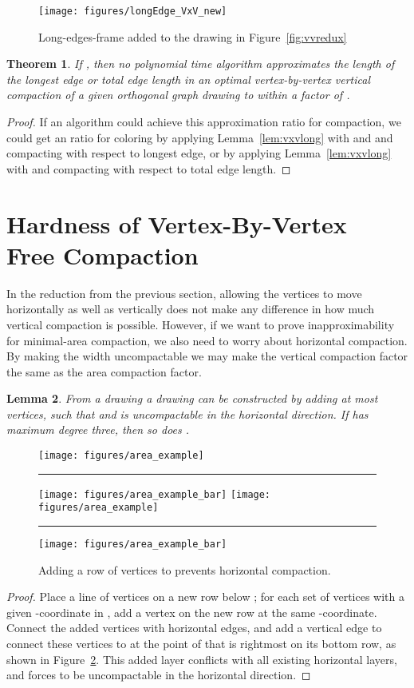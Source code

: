 \documentclass[12pt]{article}
\newtheorem{theorem}{Theorem}
\newtheorem{lemma}[theorem]{Lemma}
\theoremstyle{definitions}
\begin{document}
\begin{figure}[t]
\centering
\texttt{[image: figures/longEdge\_VxV\_new]}
\caption{
\label{fig:longEdge_VxV}
Long-edges-frame added to the drawing in Figure~\ref{fig:vvredux}}
\end{figure}

\begin{theorem}
If , then no polynomial time algorithm approximates the length of the longest edge or total edge length in an optimal vertex-by-vertex vertical compaction of a given orthogonal graph drawing to within a factor of .
\end{theorem}
\begin{proof}
If an algorithm could achieve this approximation ratio for compaction, we could get an  ratio for coloring by applying Lemma~\ref{lem:vxvlong} with  and  and compacting with respect to longest edge, or by applying Lemma~\ref{lem:vxvlong} with  and compacting with respect to total edge length.
\end{proof}

\section{Hardness of Vertex-By-Vertex\\ Free Compaction}

In the reduction from the previous section, allowing the vertices to move horizontally as well as vertically does not make any difference in how much vertical compaction is possible. However, if we want to prove inapproximability for minimal-area compaction, we also need to worry about horizontal compaction.
By making the width uncompactable we may make the vertical compaction factor the same
as the area compaction factor.

\begin{lemma}
\label{lem:fixbar}
From a drawing  a drawing  can be constructed by adding at most
 vertices, such that  and  is
uncompactable in the horizontal direction. If  has maximum degree three, then so does .
\end{lemma}

\begin{figure}[t]
\centering
\ifFull
\texttt{[image: figures/area\_example]}\rule{2em}{0em}
\texttt{[image: figures/area\_example\_bar]}
\else
\texttt{[image: figures/area\_example]}\rule{2em}{0em}
\texttt{[image: figures/area\_example\_bar]}
\fi
\caption{Adding a row of vertices to  prevents  horizontal compaction.}
\label{fig:uncompactable}
\end{figure}
\begin{proof}
Place a line of vertices on a new row below ; for each set of vertices with a given -coordinate in , add a vertex on the new row at the
same -coordinate. Connect the added
vertices with horizontal edges, and add a vertical edge to connect these vertices to  at the point of  that is rightmost on its bottom row, as shown in Figure~\ref{fig:uncompactable}. This added layer conflicts with all
existing horizontal layers, and forces  to be uncompactable in the
horizontal direction.
\end{proof}
\end{document}
